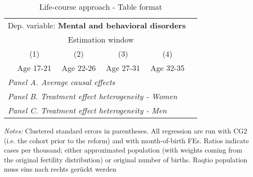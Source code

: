  \begin{table}[H] \centering \begin{threeparttable} \caption{Life-course approach - Table format} {\def\sym#1{\ifmmode^{#1}\else\(^{#1}\)\fi} \begin{tabular}{l*{5}{c}} \toprule \multicolumn{5}{l}{Dep. variable: \textbf{Mental and behavioral disorders}} \\ & \multicolumn{4}{c}{Estimation window} \\ \cmidrule(lr){2-5}
            &\multicolumn{1}{c}{(1)}&\multicolumn{1}{c}{(2)}&\multicolumn{1}{c}{(3)}&\multicolumn{1}{c}{(4)}\\
            &\multicolumn{1}{c}{Age 17-21}&\multicolumn{1}{c}{Age 22-26}&\multicolumn{1}{c}{Age 27-31}&\multicolumn{1}{c}{Age 32-35}\\
\midrule
 \multicolumn{5}{l}{\emph{Panel A. Average causal effects}} \\      \midrule\multicolumn{5}{l}{\emph{Panel B. Treatment effect heterogeneity - Women}} \\      \midrule\multicolumn{5}{l}{\emph{Panel C. Treatment effect heterogeneity - Men}} \\      
\bottomrule \end{tabular} } \begin{tablenotes} \item \scriptsize \emph{Notes:} Clustered standard errors in parentheses. All regression are run with CG2 (i.e. the cohort prior to the reform) and with month-of-birth FEs. Ratios indicate cases per thousand; either approximated population (with weights coming from the original fertility distribution) or original number of births. Raqtio population muss eins nach rechts gerückt werden \end{tablenotes} \end{threeparttable} \end{table} 
